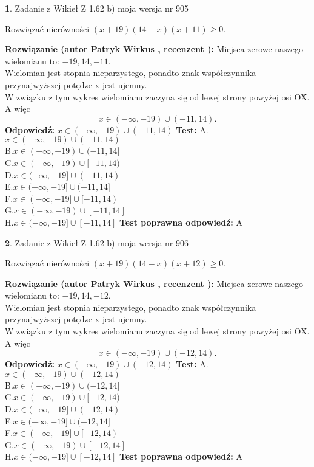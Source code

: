 \documentclass[12pt, a4paper]{article}
\theoremstyle{definition} %
\newtheorem{zad}{}
\newcommand{\zadStart}[1]{\begin{zad}#1\newline}
\newcommand{\zadStop}{\end{zad}}
\newcommand{\rozwStart}[2]{\noindent \textbf{Rozwiązanie (autor #1 , recenzent #2): }\newline}
\newcommand{\rozwStop}{\newline}
\newcommand{\odpStart}{\noindent \textbf{Odpowiedź:}\newline}
\newcommand{\odpStop}{\newline}
\newcommand{\testStart}{\noindent \textbf{Test:}\newline}
\newcommand{\testStop}{\newline}
\newcommand{\kluczStart}{\noindent \textbf{Test poprawna odpowiedź:}\newline}
\newcommand{\kluczStop}{\newline}
\begin{document}
\zadStart{Zadanie z Wikieł Z 1.62 b) moja wersja nr 905}

Rozwiązać nierówności $(x+19)(14-x)(x+11)\ge0$.
\zadStop
\rozwStart{Patryk Wirkus}{}
Miejsca zerowe naszego wielomianu to: $-19, 14, -11$.\\
Wielomian jest stopnia nieparzystego, ponadto znak współczynnika przy\linebreak najwyższej potędze x jest ujemny.\\ W związku z tym wykres wielomianu zaczyna się od lewej strony powyżej osi OX. A więc $$x \in (-\infty,-19) \cup (-11,14).$$
\rozwStop
\odpStart
$x \in (-\infty,-19) \cup (-11,14)$
\odpStop
\testStart
A.$x \in (-\infty,-19) \cup (-11,14)$\\
B.$x \in (-\infty,-19) \cup (-11,14]$\\
C.$x \in (-\infty,-19) \cup [-11,14)$\\
D.$x \in (-\infty,-19] \cup (-11,14)$\\
E.$x \in (-\infty,-19] \cup (-11,14]$\\
F.$x \in (-\infty,-19] \cup [-11,14)$\\
G.$x \in (-\infty,-19) \cup [-11,14]$\\
H.$x \in (-\infty,-19] \cup [-11,14]$
\testStop
\kluczStart
A
\kluczStop



\zadStart{Zadanie z Wikieł Z 1.62 b) moja wersja nr 906}

Rozwiązać nierówności $(x+19)(14-x)(x+12)\ge0$.
\zadStop
\rozwStart{Patryk Wirkus}{}
Miejsca zerowe naszego wielomianu to: $-19, 14, -12$.\\
Wielomian jest stopnia nieparzystego, ponadto znak współczynnika przy\linebreak najwyższej potędze x jest ujemny.\\ W związku z tym wykres wielomianu zaczyna się od lewej strony powyżej osi OX. A więc $$x \in (-\infty,-19) \cup (-12,14).$$
\rozwStop
\odpStart
$x \in (-\infty,-19) \cup (-12,14)$
\odpStop
\testStart
A.$x \in (-\infty,-19) \cup (-12,14)$\\
B.$x \in (-\infty,-19) \cup (-12,14]$\\
C.$x \in (-\infty,-19) \cup [-12,14)$\\
D.$x \in (-\infty,-19] \cup (-12,14)$\\
E.$x \in (-\infty,-19] \cup (-12,14]$\\
F.$x \in (-\infty,-19] \cup [-12,14)$\\
G.$x \in (-\infty,-19) \cup [-12,14]$\\
H.$x \in (-\infty,-19] \cup [-12,14]$
\testStop
\kluczStart
A
\kluczStop
\end{document}
